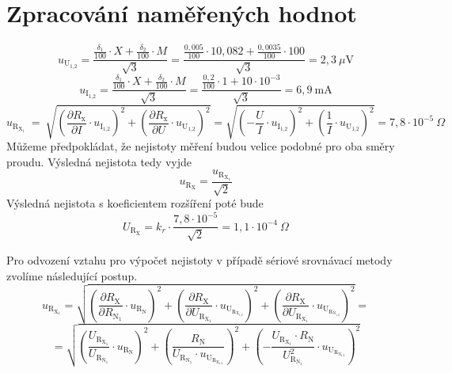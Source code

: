 \documentclass[a4paper,12pt]{article}   %
\renewcommand{\t}[1]{\text{#1}}
\begin{document}
\section{Zpracování naměřených hodnot}
\label{chap:zpracovani_hodnot}
\begin{equation}
  u_\text{U$_\text{1,2}$}=\frac{\frac{\delta_1}{100}\cdot X+\frac{\delta_2}{100}\cdot M}{\sqrt{3}} = \frac{\frac{0,005}{100}\cdot 10,082+\frac{0,0035}{100}\cdot 100}{\sqrt{3}} = 2,3~\mu\text{V}
\end{equation}
\begin{equation}
  u_\text{I$_\text{1,2}$}=\frac{\frac{\delta_1}{100}\cdot X+\frac{\delta_2}{100}\cdot M}{\sqrt{3}} = \frac{\frac{0,2}{100}\cdot 1 + 10\cdot 10^{-3}}{\sqrt{3}} = 6,9~\text{mA}
\end{equation}
\begin{equation}
  u_{\text{R}_{\text{X}_\text{1}}}~=~\sqrt{\left(\frac{\partial R_\t{x}}{\partial I}\cdot u_{\t{I}_{\t{1,2}}}\right)^2 + \left(\frac{\partial R_\t{x}}{\partial U}\cdot u_{\t{U}_{\t{1,2}}}\right)^2} = \sqrt{\left(-\frac{U}{I} \cdot u_{\t{I}_{\t{1,2}}} \right)^2 + \left(\frac{1}{I} \cdot u_{\t{U}_{\t{1,2}}} \right)^2} = 7,8\cdot 10^{-5}~\Omega
\end{equation}
Můžeme předpokládat, že nejistoty měření budou velice podobné pro oba směry proudu. Výsledná nejistota tedy vyjde
\begin{equation}
  u_{\t{R}_\t{X}}=\frac{u_{\text{R}_{\text{X}_\text{1}}}}{\sqrt{2}}
\end{equation}
Výsledná nejistota s koeficientem rozšíření poté bude
\begin{equation}
  U_{\t{R}_\t{X}}=k_r\cdot \frac{7,8\cdot 10^{-5}}{\sqrt{2}} = 1,1\cdot 10^{-4}~\Omega
\end{equation}

Pro odvození vztahu pro výpočet nejistoty v případě sériové srovnávací metody zvolíme následující postup.
\begin{equation}
  u_{\t{R}_{\t{X}_\t{1}}} = \sqrt{\left(\frac{\partial R_\t{X}}{\partial R_{\t{N}_\t{1}}}\cdot u_{\t{R}_\t{N}}\right)^2 + \left(\frac{\partial R_\t{X}}{\partial U_{\t{R}_{\t{X}_\t{1}}}}\cdot u_{\t{U}_{\t{R}_{\t{X}_\t{1,2}}}}\right)^2 + \left(\frac{\partial R_\t{X}}{\partial U_{\t{R}_{\t{X}_\t{1}}}}\cdot u_{\t{U}_{\t{R}_{\t{N}_\t{1,2}}}}\right)^2} = 
\end{equation}
\begin{equation*}
  =\sqrt{\left(\frac{U_{\t{R}_{\t{X}_\t{1}}}}{U_{\t{R}_{\t{N}_\t{1}}}}\cdot u_{\t{R}_\t{N}} \right)^2 + \left(\frac{R_\t{N}}{U_{\t{R}_{\t{N}_\t{1}}}\cdot u_{\t{U}_{\t{R}_{\t{X}_\t{1,2}}}}}\right)^2 + \left(-\frac{U_{\t{R}_{\t{X}_\t{1}}}\cdot R_\t{N}}{U^2_{\t{R}_{\t{N}_\t{1}}}} \cdot u_{\t{U}_{\t{R}_{\t{N}_\t{1,2}}}}\right)^2}
\end{equation*}
\end{document}
